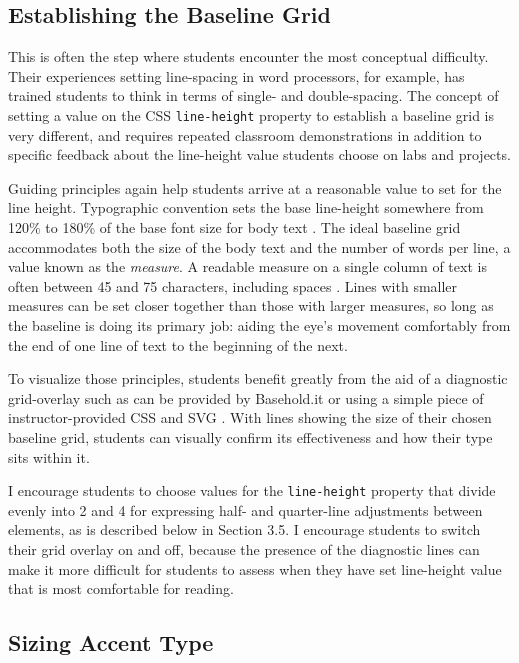 \documentclass[sigplan,screen]{acmart}
\begin{document}
\subsection{Establishing the Baseline Grid}

This is often the step where students encounter the most conceptual difficulty. Their experiences setting line-spacing in word processors, for example, has trained students to think in terms of single- and double-spacing. The concept of setting a value on the CSS \verb|line-height| property to establish a baseline grid is very different, and requires repeated classroom demonstrations in addition to specific feedback about the line-height value students choose on labs and projects.

Guiding principles again help students arrive at a reasonable value to set for the line height. Typographic convention sets the base line-height somewhere from 120\% to 180\% of the base font size for body text \cite[p.~92]{jsm:owt}. The ideal baseline grid accommodates both the size of the body text and the number of words per line, a value known as the {\itshape measure}. A readable measure on a single column of text is often between 45 and 75 characters, including spaces \cite[pp. 26–27]{rb:style}. Lines with smaller measures can be set closer together than those with larger measures, so long as the baseline is doing its primary job: aiding the eye's movement comfortably from the end of one line of text to the beginning of the next.

To visualize those principles, students benefit greatly from the aid of a diagnostic grid-overlay such as can be provided by Basehold.it or using a simple piece of instructor-provided CSS and SVG \cite{basehold}. With lines showing the size of their chosen baseline grid, students can visually confirm its effectiveness and how their type sits within it.

I encourage students to choose values for the \verb|line-height| property that divide evenly into 2 and 4 for expressing half- and quarter-line adjustments between elements, as is described below in Section 3.5. I encourage students to switch their grid overlay on and off, because the presence of the diagnostic lines can make it more difficult for students to assess when they have set line-height value that is most comfortable for reading.

\subsection{Sizing Accent Type}
\end{document}

